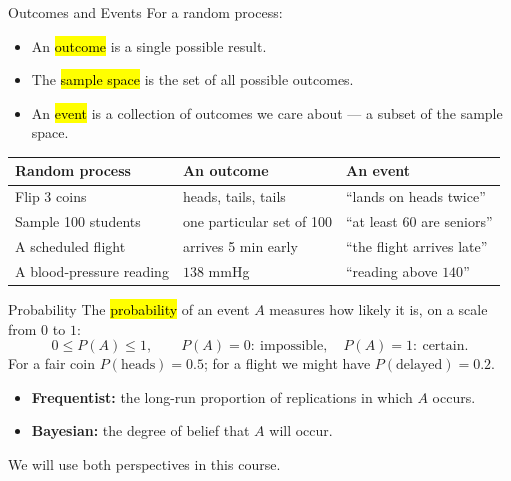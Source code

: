 \documentclass[slidestop,compress,mathserif]{beamer}
\begin{document}
\begin{frame}{Outcomes and Events}
    For a random process:
    \begin{itemize}
        \item An \hl{outcome} is a single possible result.
        \item The \hl{sample space} is the set of all possible outcomes.
        \item An \hl{event} is a collection of outcomes we care about --- a subset of the sample space.
    \end{itemize}

    \vspace{0.25cm}
    \begin{center}
    \footnotesize
    \renewcommand{\arraystretch}{1.25}
    \begin{tabular}{lll}
    \hline
    Random process & An outcome & An event \\
    \hline
    Flip 3 coins & heads, tails, tails & ``lands on heads twice'' \\
    Sample 100 students & one particular set of 100 & ``at least 60 are seniors'' \\
    A scheduled flight & arrives 5 min early & ``the flight arrives late'' \\
    A blood-pressure reading & $138$ mmHg & ``reading above $140$'' \\
    \hline
    \end{tabular}
    \end{center}
\end{frame}

\begin{frame}{Probability}
    The \hl{probability} of an event $A$ measures how likely it is, on a scale from $0$ to $1$:
    \[ 0 \le P(A) \le 1, \qquad P(A)=0:\ \text{impossible}, \quad P(A)=1:\ \text{certain}. \]
    For a fair coin $P(\text{heads}) = 0.5$; for a flight we might have $P(\text{delayed}) = 0.2$.

    \begin{itemize}
      \item \textbf{Frequentist:} the long-run proportion of replications in which $A$ occurs.
      \item \textbf{Bayesian:} the degree of belief that $A$ will occur.
    \end{itemize}

    \vspace{0.15cm}
    We will use both perspectives in this course.
\end{frame}
\end{document}
